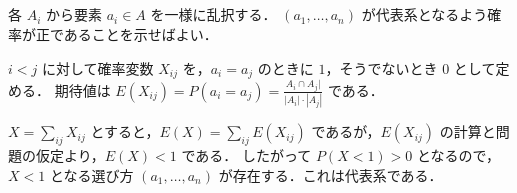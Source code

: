 \subsection{}
各 $A_i$ から要素 $a_i\in A$ を一様に乱択する．
$(a_1,\ldots,a_n)$ が代表系となるよう確率が正であることを示せばよい．

$i < j$ に対して確率変数 $X_{ij}$ を，$a_i = a_j$ のときに $1$，そうでないとき $0$ として定める．
期待値は $E(X_{ij}) = P(a_i=a_j) = \frac{A_i\cap A_j|}{|A_i|\cdot|A_j|}$ である．

$X = \sum_{ij} X_{ij}$ とすると，$E(X) = \sum_{ij}E(X_{ij})$ であるが，$E(X_{ij})$ の計算と問題の仮定より，$E(X) < 1$ である．
したがって $P(X<1) > 0$ となるので，$X<1$ となる選び方 $(a_1,\ldots,a_n)$ が存在する．これは代表系である．